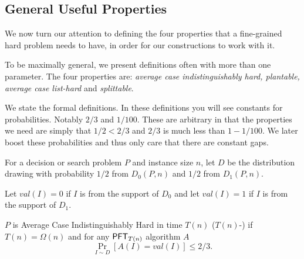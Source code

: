 %
%

\subsection{General Useful Properties}
We now turn our attention to defining the four properties that a fine-grained hard problem needs to have, in order for our constructions to work with it.

To be maximally general, we present definitions often with more than one parameter. The four properties are: {\em average case indistinguishably hard, plantable, average case list-hard} and {\em splittable}. 


We state the formal definitions. In these definitions you will see constants for probabilities. Notably $2/3$ and $1/100$. These are arbitrary in that the properties we need are simply that $1/2 <2/3$ and $2/3$ is much less than $1-1/100$. We later boost these probabilities and thus only care that there are constant gaps.


\begin{definition}
\label{def:acih}
For a decision or search problem $P$ and instance size $n$, let $D$ be the distribution drawing with probability $1/2$ from $D_{0}(P,n)$ and $1/2$ from $D_{1}(P,n)$.

Let $val(I)=0$ if $I$ is from the support of $D_0$ and let  $val(I)=1$ if $I$ is from the support of $D_1$.

$P$ is Average Case Indistinguishably Hard in time $T(n)$ ($T(n)$-\ACIH) if $T(n)=\Omega(n)$ and
for any  $\mathsf{PFT}_{ T(n)}$ algorithm $A$
\[ \Pr_{I \sim D}[A(I) = val(I)] \le 2/3 .\]
\end{definition}

